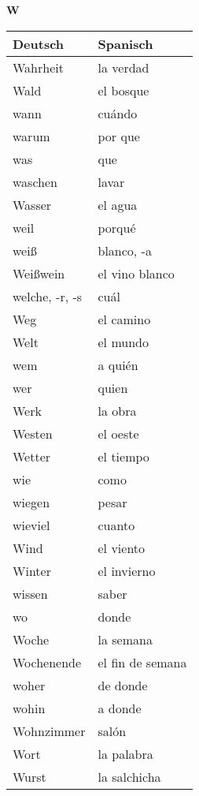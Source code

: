 \begin{flushright}\begin{Huge}\textbf{W}\end{Huge}\end{flushright}

\begin{longtable}{p{} p{}} 
\textbf{Deutsch}     & \textbf{Spanisch}                                       \\ \hline
\hline
\endhead %
Wahrheit & la verdad\\
Wald & el bosque\\
wann & cuándo\\
warum & por que\\
was & que\\
waschen & lavar\\
Wasser & el agua\\
weil & porqué\\
weiß & blanco, -a\\
Weißwein & el vino blanco\\
welche, -r, -s & cuál \\
Weg & el camino\\
Welt & el mundo\\
wem & a quién\\
wer & quien\\
Werk & la obra\\
Westen & el oeste\\
Wetter & el tiempo\\
wie & como\\
wiegen & pesar\\
wieviel & cuanto \\
Wind & el viento\\
Winter & el invierno\\
wissen & saber\\
wo & donde\\
Woche & la semana\\
Wochenende & el fin de semana\\
woher & de donde\\
wohin & a donde\\
Wohnzimmer & salón\\
Wort & la palabra\\
Wurst & la salchicha\\
\end{longtable}
